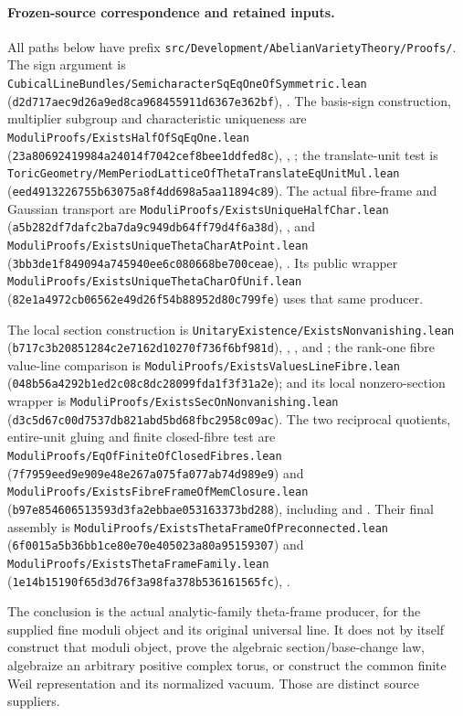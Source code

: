 \paragraph{Frozen-source correspondence and retained inputs.}
All paths below have prefix
\texttt{src/Development/AbelianVarietyTheory/Proofs/}.
The sign argument is
\texttt{CubicalLineBundles/SemicharacterSqEqOneOfSymmetric.lean}
(\texttt{d2d717aec9d26a9ed8ca968455911d6367e362bf}),
.
The basis-sign construction, multiplier subgroup and
characteristic uniqueness are
\texttt{ModuliProofs/ExistsHalfOfSqEqOne.lean}
(\texttt{23a80692419984a24014f7042cef8bee1ddfed8c}),
, ;
the translate-unit test is
\texttt{ToricGeometry/MemPeriodLatticeOfThetaTranslateEqUnitMul.lean}
(\texttt{eed4913226755b63075a8f4dd698a5aa11894c89}).
The actual fibre-frame and Gaussian transport are
\texttt{ModuliProofs/ExistsUniqueHalfChar.lean}
(\texttt{a5b282df7dafc2ba7da9c949db64ff79d4f6a38d}),
, and
\texttt{ModuliProofs/ExistsUniqueThetaCharAtPoint.lean}
(\texttt{3bb3de1f849094a745940ee6c080668be700ceae}),
.
Its public wrapper
\texttt{ModuliProofs/ExistsUniqueThetaCharOfUnif.lean}
(\texttt{82e1a4972cb06562e49d26f54b88952d80c799fe})
uses that same producer.

The local section construction is
\texttt{UnitaryExistence/ExistsNonvanishing.lean}
(\texttt{b717c3b20851284c2e7162d10270f736f6bf981d}),
,
, and
;
the rank-one fibre value-line comparison is
\texttt{ModuliProofs/ExistsValuesLineFibre.lean}
(\texttt{048b56a4292b1ed2c08c8dc28099fda1f3f31a2e});
and its local nonzero-section wrapper is
\texttt{ModuliProofs/ExistsSecOnNonvanishing.lean}
(\texttt{d3c5d67c00d7537db821abd5bd68fbc2958c09ac}).
The two reciprocal quotients, entire-unit gluing and
finite closed-fibre test are
\texttt{ModuliProofs/EqOfFiniteOfClosedFibres.lean}
(\texttt{7f7959eed9e909e48e267a075fa077ab74d989e9})
and
\texttt{ModuliProofs/ExistsFibreFrameOfMemClosure.lean}
(\texttt{b97e854606513593d3fa2ebbae053163373bd288}),
including  and
.
Their final assembly is
\texttt{ModuliProofs/ExistsThetaFrameOfPreconnected.lean}
(\texttt{6f0015a5b36bb1ce80e70e405023a80a95159307})
and \texttt{ModuliProofs/ExistsThetaFrameFamily.lean}
(\texttt{1e14b15190f65d3d76f3a98fa378b536161565fc}),
.

The conclusion is the actual analytic-family theta-frame
producer, for the supplied fine moduli object and its
original universal line.
It does not by itself construct that moduli object,
prove the algebraic section/base-change law, algebraize
an arbitrary positive complex torus, or construct the
common finite Weil representation and its normalized
vacuum.  Those are distinct source suppliers.

